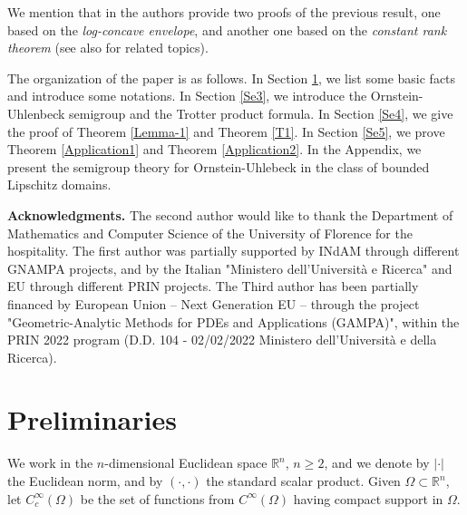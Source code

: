\documentclass[12pt]{amsart}
\newcommand{\R}{\mathbb R}
\newcommand{\1}{\mathbf 1}
\begin{document}
We mention that in \cite{CFLS24} the authors provide two proofs of the previous result, one based on the {\it log-concave envelope}, and another one based on the {\it constant rank theorem} (see also \cite{CCLaMP,Colesanti2025,LeiQin2025} for related topics).






\medskip

The organization of the paper is as follows. In Section \ref{Se2}, we list some basic facts and introduce some notations. In Section \ref{Se3}, we introduce the Ornstein-Uhlenbeck semigroup and the Trotter product formula. In Section \ref{Se4}, we give the proof of  Theorem \ref{Lemma-1} and Theorem \ref{T1}. In Section \ref{Se5}, we prove Theorem \ref{Application1} and Theorem \ref{Application2}. In the Appendix, we present the semigroup theory for Ornstein-Uhlebeck in the class of bounded Lipschitz domains.

\medskip

{\bf Acknowledgments.} The second author would like to thank the Department of Mathematics and Computer Science of the University of Florence for the hospitality.
The first author was partially supported by INdAM through different GNAMPA projects, and by the Italian "Ministero dell'Universit\`a e Ricerca" and EU through different PRIN projects. The Third author has been partially financed by European Union -- Next Generation EU -- through the project "Geometric-Analytic Methods for PDEs and Applications (GAMPA)", within the PRIN 2022 program (D.D. 104 - 02/02/2022 Ministero dell'Universit\`a e della Ricerca).


\section{Preliminaries}\label{Se2}

We work in the $n$-dimensional Euclidean space $\mathbb{R}^n$, $n\geq 2$, and we denote by $|\cdot|$ the Euclidean norm, and by $(\cdot,\cdot)$ the standard scalar product.  Given $\Omega\subset\R^n$, let $C_{c}^{\infty}(\Omega)$ be the set of functions from $C^{\infty}(\Omega)$ having compact support in $\Omega$.
\end{document}
